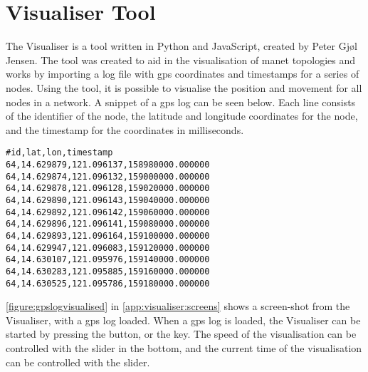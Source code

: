 \section{Visualiser Tool}\label{sec:visualiser}
The Visualiser is a tool written in Python and JavaScript, created by Peter Gjøl Jensen. The tool was created
to aid in the visualisation of \gls{manet} topologies and works by importing a log file with \acrshort{gps}
coordinates and timestamps for a series of nodes. Using the tool, it is possible to visualise the position and
movement for all nodes in a network. A snippet of a \acrshort{gps} log can be seen below. Each line consists
of the identifier of the node, the latitude and longitude coordinates for the node, and the timestamp for the
coordinates in milliseconds.
%
\begin{verbatim}
#id,lat,lon,timestamp
64,14.629879,121.096137,158980000.000000
64,14.629874,121.096132,159000000.000000
64,14.629878,121.096128,159020000.000000
64,14.629890,121.096143,159040000.000000
64,14.629892,121.096142,159060000.000000
64,14.629896,121.096141,159080000.000000
64,14.629893,121.096164,159100000.000000
64,14.629947,121.096083,159120000.000000
64,14.630107,121.095976,159140000.000000
64,14.630283,121.095885,159160000.000000
64,14.630525,121.095786,159180000.000000
\end{verbatim}

\autoref{figure:gpslogvisualised} in \autoref{app:visualiser:screens} shows a screen-shot from the Visualiser,
with a \acrshort{gps} log loaded. When a \acrshort{gps} log is loaded, the Visualiser can be started by
pressing the  button, or the  key. The speed of the visualisation can be
controlled with the  slider in the bottom, and the current time of the visualisation can
be controlled with the  slider. 

